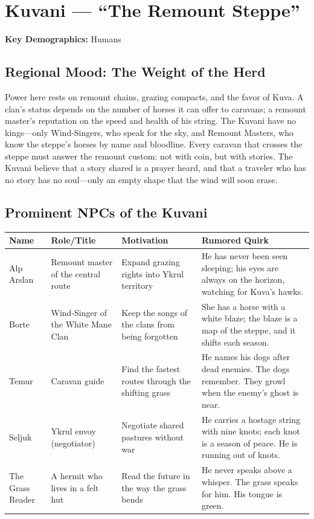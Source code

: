 \section{Kuvani --- ``The Remount Steppe''}
\label{chap:kuvani}

\textbf{Key Demographics: } Humans

\subsection*{Regional Mood: The Weight of the Herd}

Power here rests on remount chains, grazing compacts, and the favor of Kuva. A clan's status depends on the number of horses it can offer to caravans; a remount master's reputation on the speed and health of his string. The Kuvani have no kings---only Wind-Singers, who speak for the sky, and Remount Masters, who know the steppe's horses by name and bloodline. Every caravan that crosses the steppe must answer the remount custom: not with coin, but with stories. The Kuvani believe that a story shared is a prayer heard, and that a traveler who has no story has no soul---only an empty shape that the wind will soon erase.

\subsection*{Prominent NPCs of the Kuvani}
\label{sec:kuvani-npcs}

\begin{longtable}{|p{}|p{}|p{}|p{}|}
\hline
\textbf{Name} & \textbf{Role/Title} & \textbf{Motivation} & \textbf{Rumored Quirk} \\
\hline
Alp Arslan & Remount master of the central route & Expand grazing rights into Ykrul territory & He has never been seen sleeping; his eyes are always on the horizon, watching for Kuva's hawks. \\
\hline
Borte & Wind-Singer of the White Mane Clan & Keep the songs of the clans from being forgotten & She has a horse with a white blaze; the blaze is a map of the steppe, and it shifts each season. \\
\hline
Temur & Caravan guide & Find the fastest routes through the shifting grass & He names his dogs after dead enemies. The dogs remember. They growl when the enemy's ghost is near. \\
\hline
Seljuk & Ykrul envoy (negotiator) & Negotiate shared pastures without war & He carries a hostage string with nine knots; each knot is a season of peace. He is running out of knots. \\
\hline
The Grass Reader & A hermit who lives in a felt hut & Read the future in the way the grass bends & He never speaks above a whisper. The grass speaks for him. His tongue is green. \\
\hline
\end{longtable}

